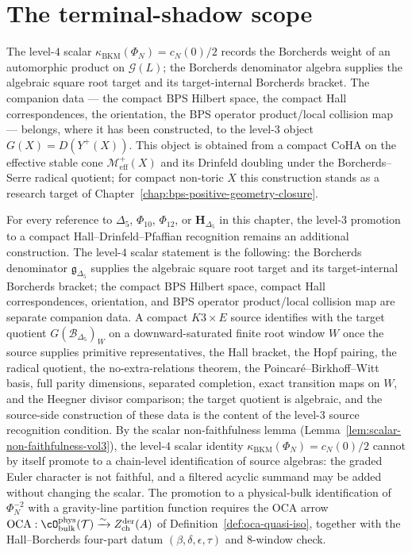 \section{The terminal-shadow scope}
\label{sec:terminus-shadow-scope}

The level-$4$ scalar $\kappa_{\mathrm{BKM}}(\Phi_N) = c_N(0)/2$
records the Borcherds weight of an automorphic product on
$\mathcal G(L)$; the Borcherds denominator algebra supplies the
algebraic square root target and its target-internal Borcherds
bracket.  The companion data --- the compact BPS Hilbert space, the
compact Hall correspondences, the orientation, the BPS operator
product/local collision map --- belongs, where it has been constructed,
to the level-$3$ object \(G(X)=D(Y^+(X))\). This object is obtained
from a compact CoHA on the effective stable cone
\(\mathcal M^+_{\mathrm{eff}}(X)\) and its Drinfeld doubling under the
Borcherds--Serre radical quotient; for compact non-toric \(X\) this
construction stands as a research target of
Chapter~\ref{chap:bps-positive-geometry-closure}.

\begin{remark}
\label{rem:terminus-igusa-scope}
For every reference to $\Delta_5$, $\Phi_{10}$, $\Phi_{12}$, or
$\mathbf H_{\Delta_5}$ in this chapter, the level-$3$ promotion to
a compact Hall--Drinfeld--Pfaffian recognition remains an additional
construction.  The level-$4$ scalar statement is the following:
the Borcherds denominator $\mathfrak g_{\Delta_5}$ supplies the
algebraic square root target and its target-internal Borcherds bracket;
the compact BPS Hilbert space, compact Hall correspondences,
orientation, and BPS operator product/local collision map are separate
companion data.  A compact
$K3 \times E$ source identifies with the target quotient
$G(\mathscr B_{\Delta_5})_W$ on a downward-saturated finite root
window $W$ once the source supplies primitive representatives, the
Hall bracket, the Hopf pairing, the radical quotient, the
no-extra-relations theorem, the Poincar\'e--Birkhoff--Witt basis,
full parity dimensions, separated completion, exact transition maps on
$W$, and the Heegner divisor comparison;
the target quotient is algebraic, and the source-side construction
of these data is the content of the level-$3$ source recognition
condition. By the scalar non-faithfulness lemma
(Lemma~\ref{lem:scalar-non-faithfulness-vol3}), the level-$4$
scalar identity $\kappa_{\mathrm{BKM}}(\Phi_N) = c_N(0)/2$ cannot
by itself promote to a chain-level identification of source
algebras: the graded Euler character is not faithful, and a
filtered acyclic summand may be added without changing the scalar.
The promotion to a physical-bulk identification of $\Phi_N^{-2}$
with a gravity-line partition function requires the OCA arrow
$\mathrm{OCA}: \cO^{\mathrm{phys}}_{\mathrm{bulk}}(\mathcal T) \xrightarrow{\sim}
Z^{\mathrm{der}}_{\mathrm{ch}}(A)$ of
Definition~\ref{def:oca-quasi-iso}, together with the
Hall--Borcherds four-part datum $(\beta, \delta, \epsilon, \tau)$ and
$8$-window check.
\end{remark}

